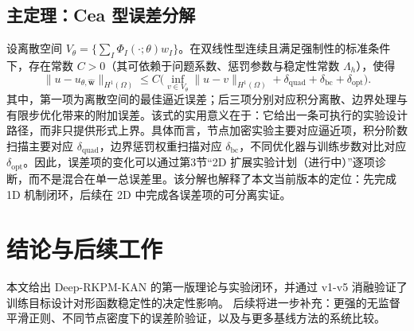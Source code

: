 ﻿\documentclass[lang=cn,a4paper]{elegantpaper}
\begin{document}
\subsection{主定理：Cea 型误差分解}
设离散空间 $V_\theta=\{\sum_I\Phi_I(\cdot;\theta)w_I\}$。在双线性型连续且满足强制性的标准条件下，存在常数 $C>0$（其可依赖于问题系数、惩罚参数与稳定性常数 $\Lambda_h$），使得
\begin{equation}
  \|u-u_{\theta,\hat{\bm{w}}}\|_{H^1(\Omega)}
  \le C\Big(\inf_{v\in V_\theta}\|u-v\|_{H^1(\Omega)}
  +\delta_{\mathrm{quad}}+\delta_{\mathrm{bc}}+\delta_{\mathrm{opt}}\Big).
\end{equation}
其中，第一项为离散空间的最佳逼近误差；后三项分别对应积分离散、边界处理与有限步优化带来的附加误差。该式的实用意义在于：它给出一条可执行的实验设计路径，而非只提供形式上界。具体而言，节点加密实验主要对应逼近项，积分阶数扫描主要对应 $\delta_{\mathrm{quad}}$，边界惩罚权重扫描对应 $\delta_{\mathrm{bc}}$，不同优化器与训练步数对比对应 $\delta_{\mathrm{opt}}$。因此，误差项的变化可以通过第3节“2D 扩展实验计划（进行中）”逐项诊断，而不是混合在单一总误差里。该分解也解释了本文当前版本的定位：先完成 1D 机制闭环，后续在 2D 中完成各误差项的可分离实证。

\section{结论与后续工作}
本文给出 Deep-RKPM-KAN 的第一版理论与实验闭环，并通过 v1-v5 消融验证了训练目标设计对形函数稳定性的决定性影响。
后续将进一步补充：更强的无监督平滑正则、不同节点密度下的误差阶验证，以及与更多基线方法的系统比较。

\printbibliography[heading=bibintoc, title=\ebibname]
\end{document}
